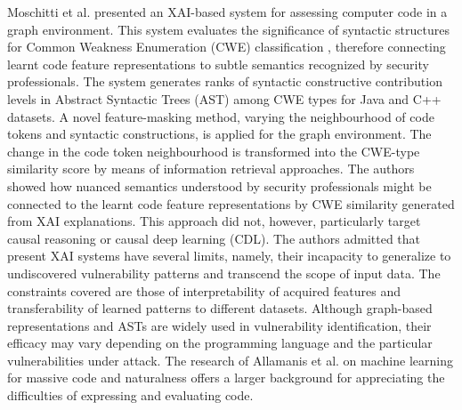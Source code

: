\documentclass{buthesis}
\begin{document}
Moschitti et al. \cite{Moschitti2024} presented an XAI-based system for assessing computer code in a graph environment. This system evaluates the significance of syntactic structures for Common Weakness Enumeration (CWE) classification \cite{li2023xai}, therefore connecting learnt code feature representations to subtle semantics recognized by security professionals. The system generates ranks of syntactic constructive contribution levels in Abstract Syntactic Trees (AST) among CWE types for Java and C++ datasets. A novel feature-masking method, varying the neighbourhood of code tokens and syntactic constructions, is applied for the graph environment. The change in the code token neighbourhood is transformed into the CWE-type similarity score by means of information retrieval approaches. The authors showed how nuanced semantics understood by security professionals might be connected to the learnt code feature representations by CWE similarity generated from XAI explanations. This approach did not, however, particularly target causal reasoning or causal deep learning (CDL). The authors admitted that present XAI systems have several limits, namely, their incapacity to generalize to undiscovered vulnerability patterns and transcend the scope of input data. The constraints covered are those of interpretability of acquired features and transferability of learned patterns to different datasets. Although graph-based representations and ASTs are widely used in vulnerability identification, their efficacy may vary depending on the programming language and the particular vulnerabilities under attack. The research of Allamanis et al. \cite{Xia2023} on machine learning for massive code and naturalness offers a larger background for appreciating the difficulties of expressing and evaluating code.
\end{document}
